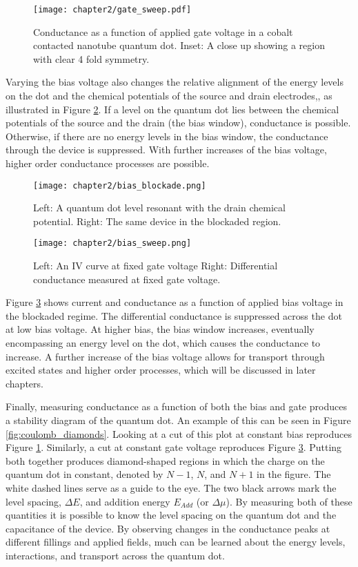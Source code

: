 \begin{figure}
    \centering
    \texttt{[image: chapter2/gate\_sweep.pdf]}
    \caption{Conductance as a function of applied gate voltage in a cobalt contacted nanotube quantum dot. Inset: A close up showing a region with clear 4 fold symmetry.}
    \label{fig:real_gate}
\end{figure}

Varying the bias voltage also changes the relative alignment of the energy levels on the dot and the chemical potentials of the source and drain electrodes,, as illustrated in Figure \ref{fig:bias_blockade}. If a level on the quantum dot lies between the chemical potentials of the source and the drain (the bias window), conductance is possible. Otherwise, if there are no energy levels in the bias window, the conductance through the device is suppressed. With further increases of the bias voltage, higher order conductance processes are possible. 

\begin{figure}
    \centering
    \texttt{[image: chapter2/bias\_blockade.png]}
    \caption{Left: A quantum dot level resonant with the drain chemical potential. Right: The same device in the blockaded region.}
    \label{fig:bias_blockade}
\end{figure}

\begin{figure}
    \centering
    \texttt{[image: chapter2/bias\_sweep.png]}
    \caption{Left: An IV curve at fixed gate voltage Right: Differential conductance measured at fixed gate voltage.}
    \label{fig:real_bias}
\end{figure}

Figure \ref{fig:real_bias} shows current and conductance as a function of applied bias voltage in the blockaded regime. The differential conductance is suppressed across the dot at low bias voltage. At higher bias, the bias window increases, eventually encompassing an energy level on the dot, which causes the conductance to increase. A further increase of the bias voltage allows for transport through excited states and higher order processes, which will be discussed in later chapters.

Finally, measuring conductance as a function of both the bias and gate produces a stability diagram of the quantum dot. An example of this can be seen in Figure \ref{fig:coulomb_diamonds}. Looking at a cut of this plot at constant bias reproduces Figure \ref{fig:real_gate}. Similarly, a cut at constant gate voltage reproduces Figure \ref{fig:real_bias}. Putting both together produces diamond-shaped regions in which the charge on the quantum dot in constant, denoted by $N-1$, $N$, and $N+1$ in the figure. The white dashed lines serve as a guide to the eye. The two black arrows mark the level spacing, $\Delta E$, and addition energy $E_{Add}$ (or $\Delta \mu$). By measuring both of these quantities it is possible to know the level spacing on the quantum dot and the capacitance of the device. By observing changes in the conductance peaks at different fillings and applied fields, much can be learned about the energy levels, interactions, and transport across the quantum dot.

